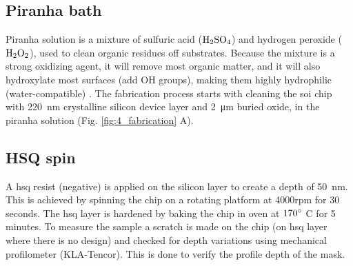 \documentclass[../report.tex]{subfiles}
\begin{document}
\subsection{Piranha bath}			
Piranha solution is a mixture of sulfuric acid ($\mathrm{H_2SO_4}$) and hydrogen peroxide ($\mathrm{H_2O_2}$), used to clean organic residues off substrates. Because the mixture is a strong oxidizing agent, it will remove most organic matter, and it will also hydroxylate most surfaces (add OH groups), making them highly hydrophilic (water-compatible) \cite{piranha_bath}. The fabrication process starts with cleaning the \gls{soi} chip with \SI{220}{\nano \meter} crystalline silicon device layer and \SI{2}{\micro \meter} buried oxide, in the piranha solution (Fig. \ref{fig:4_fabrication} A).
 
\subsection{HSQ spin}
A \gls{hsq} resist (negative) is applied on the silicon layer to create a depth of \SI{50}{\nano \meter}. This is achieved by spinning the chip on a  rotating platform at 4000rpm for 30 seconds. The \gls{hsq} layer is hardened by baking the chip in oven at $\mathrm{170^{\circ}}$ C for 5 minutes. To measure the sample a scratch is made on the chip (on \gls{hsq} layer where there is no design) and checked for depth variations using mechanical profilometer (KLA-Tencor). This is done to verify the profile depth of the mask.
\end{document}
